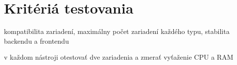 \chapter{Kritériá testovania}

kompatibilita zariadení, maximálny počet zariadení každého typu, stabilita backendu a frontendu

v každom nástroji otestovať dve zariadenia a zmerať vyťaženie CPU a RAM